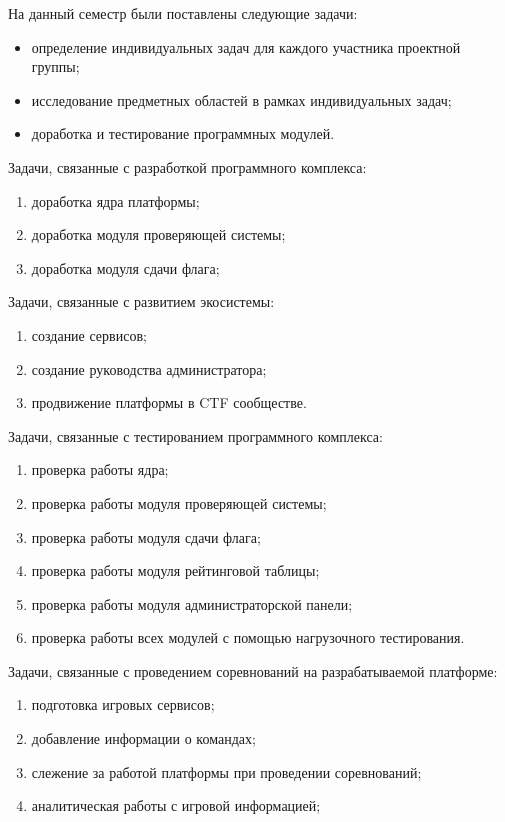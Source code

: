 На данный семестр были поставлены следующие задачи:

\begin{itemize}
\item определение индивидуальных задач для каждого участника проектной группы;
\item исследование предметных областей в рамках индивидуальных задач;
\item доработка и тестирование программных модулей.
\end{itemize}

Задачи, связанные с разработкой программного комплекса:

\begin{enumerate}
\item доработка ядра платформы;
\item доработка модуля проверяющей системы;
\item доработка модуля сдачи флага;
\end{enumerate}

Задачи, связанные с развитием экосистемы:

\begin{enumerate}
\item создание сервисов;
\item создание руководства администратора;
\item продвижение платформы в CTF сообществе.
\end{enumerate}

Задачи, связанные с тестированием программного комплекса:

\begin{enumerate}
\item проверка работы ядра;
\item проверка работы модуля проверяющей системы;
\item проверка работы модуля сдачи флага;
\item проверка работы модуля рейтинговой таблицы;
\item проверка работы модуля администраторской панели;
\item проверка работы всех модулей с помощью нагрузочного тестирования.
\end{enumerate}

Задачи, связанные с проведением соревнований на разрабатываемой платформе:

\begin{enumerate}
\item подготовка игровых сервисов;
\item добавление информации о командах;
\item слежение за работой платформы при проведении соревнований;
\item аналитическая работы с игровой информацией;
\end{enumerate}